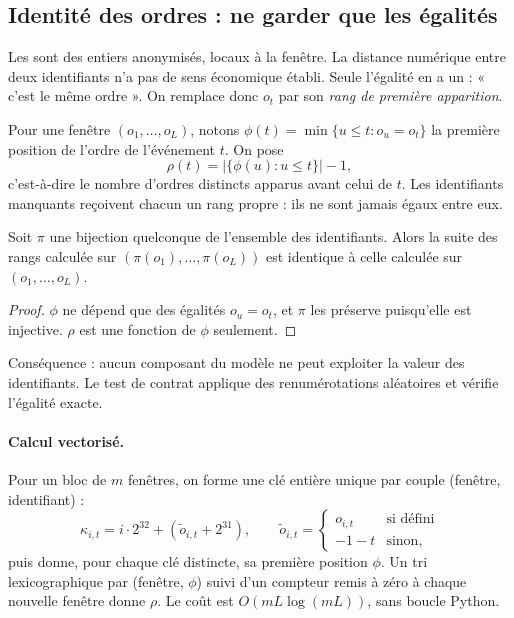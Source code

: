 \subsection{Identité des ordres : ne garder que les égalités}
Les  sont des entiers anonymisés, locaux à la fenêtre. La distance numérique entre deux identifiants n'a pas de sens économique établi. Seule l'égalité en a un : « c'est le même ordre ». On remplace donc $o_t$ par son \emph{rang de première apparition}.

\begin{definition}
Pour une fenêtre $(o_1,\dots,o_L)$, notons $\phi(t)=\min\{u\le t: o_u=o_t\}$ la première position de l'ordre de l'événement $t$. On pose
\begin{equation}
\rho(t)=\big|\{\phi(u):u\le t\}\big|-1,
\end{equation}
c'est-à-dire le nombre d'ordres distincts apparus avant celui de $t$. Les identifiants manquants reçoivent chacun un rang propre : ils ne sont jamais égaux entre eux.
\end{definition}

\begin{proposition}\label{prop:bij}
Soit $\pi$ une bijection quelconque de l'ensemble des identifiants. Alors la suite des rangs calculée sur $(\pi(o_1),\dots,\pi(o_L))$ est identique à celle calculée sur $(o_1,\dots,o_L)$.
\end{proposition}
\begin{proof}
$\phi$ ne dépend que des égalités $o_u=o_t$, et $\pi$ les préserve puisqu'elle est injective. $\rho$ est une fonction de $\phi$ seulement.
\end{proof}
\noindent Conséquence : aucun composant du modèle ne peut exploiter la valeur des identifiants. Le test de contrat applique des renumérotations aléatoires et vérifie l'égalité exacte.

\paragraph{Calcul vectorisé.} Pour un bloc de $m$ fenêtres, on forme une clé entière unique par couple (fenêtre, identifiant) :
\begin{equation}
\kappa_{i,t}=i\cdot2^{32}+(\tilde o_{i,t}+2^{31}),\qquad \tilde o_{i,t}=\begin{cases}o_{i,t}&\text{si défini}\\-1-t&\text{sinon,}\end{cases}
\end{equation}
puis  donne, pour chaque clé distincte, sa première position $\phi$. Un tri lexicographique par (fenêtre, $\phi$) suivi d'un compteur remis à zéro à chaque nouvelle fenêtre donne $\rho$. Le coût est $O(mL\log(mL))$, sans boucle Python.

